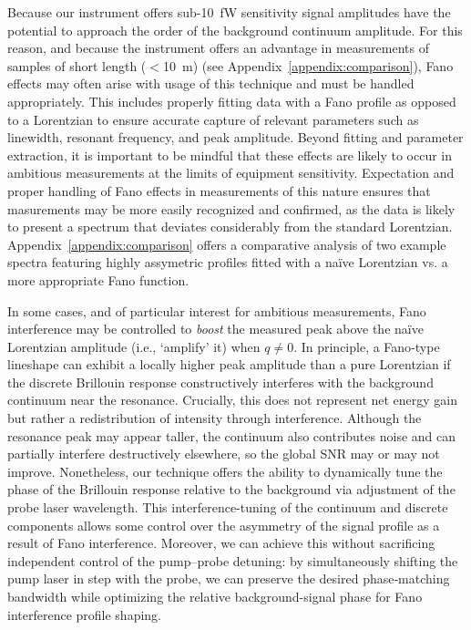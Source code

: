 Because our instrument offers sub-\SI{10}{\femto\watt} sensitivity signal amplitudes have the potential to approach the order of the background continuum amplitude. For this reason, and because the instrument offers an advantage in measurements of samples of short length (\(<\)\SI{10}{m}) (see Appendix~\ref{appendix:comparison}), Fano effects may often arise with usage of this technique and must be handled appropriately. This includes properly fitting data with a Fano profile as opposed to a Lorentzian to ensure accurate capture of relevant parameters such as linewidth, resonant frequency, and peak amplitude. Beyond fitting and parameter extraction, it is important to be mindful that these effects are likely to occur in ambitious measurements at the limits of equipment sensitivity. Expectation and proper handling of Fano effects in measurements of this nature ensures that masurements may be more easily recognized and confirmed, as the data is likely to present a spectrum that deviates considerably from the standard Lorentzian. Appendix~\ref{appendix:comparison} offers a comparative analysis of two example spectra featuring highly assymetric profiles fitted with a naïve Lorentzian vs. a more appropriate Fano function.

In some cases, and of particular interest for ambitious measurements, Fano interference may be controlled to \textit{boost} the measured peak above the naïve Lorentzian amplitude (i.e., ‘amplify’ it) when \(q \neq 0\). In principle, a Fano‐type lineshape can exhibit a locally higher peak amplitude than a pure Lorentzian if the discrete Brillouin response constructively interferes with the background continuum near the resonance. Crucially, this does not represent net energy gain but rather a redistribution of intensity through interference. Although the resonance peak may appear taller, the continuum also contributes noise and can partially interfere destructively elsewhere, so the global \ac{SNR} may or may not improve. Nonetheless, our technique offers the ability to dynamically tune the phase of the Brillouin response relative to the background via adjustment of the probe laser wavelength. This interference-tuning of the continuum and discrete components allows some control over the asymmetry of the signal profile as a result of Fano interference. Moreover, we can achieve this without sacrificing independent control of the pump–probe detuning: by simultaneously shifting the pump laser in step with the probe, we can preserve the desired phase‐matching bandwidth while optimizing the relative background-signal phase for Fano interference profile shaping.

